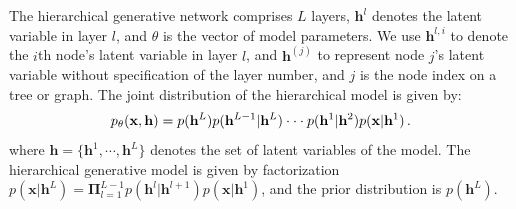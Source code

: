 \documentclass[twoside]{article}
\begin{document}
The hierarchical generative network comprises $L$ layers, $\mathbf{h}^l$ denotes the latent variable in layer $l$, and $\theta$ is the vector of model parameters. We use $\mathbf{h}^{l, i}$ to denote the $i$th node's latent variable  in layer $l$, and $\mathbf{h}^{(j)}$ to represent node $j$'s latent variable without specification of the layer number, and $j$ is the node index on a tree or graph.  
The joint distribution of the hierarchical model is given by:
\begin{align}\notag %
p_{\theta}(\mathbf{x}, \mathbf{h}) = p( \mathbf{h}^{L}) p(\mathbf{h}^{L-1} | \mathbf{h}^{L}) \cdot \cdot  \cdot p(\mathbf{h}^{1} | \mathbf{h}^{2})  p(\mathbf{x} | \mathbf{h}^{1}) \, .
\end{align}%
where $\mathbf{h}=\{\mathbf{h}^1, \cdots, \mathbf{h}^L \}$ denotes the set of latent variables of the model. The hierarchical generative model is given by factorization $p(\mathbf{x}|\mathbf{h}^L) =  \mathbf{\Pi}_{l=1}^{L-1}p(\mathbf{h}^{l} | \mathbf{h}^{l+1}) p(\mathbf{x} | \mathbf{h}^{1}) $, and the prior distribution is $p(\mathbf{h}^L)$.
\end{document}
